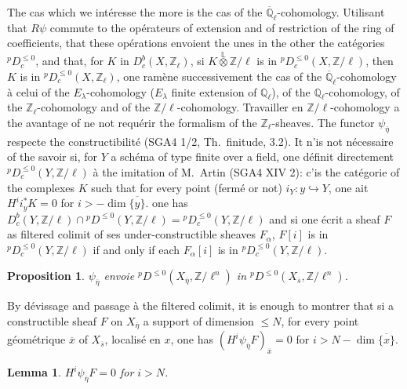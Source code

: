 \documentclass[12pt,a4paper]{article}
\theoremstyle{plain}
\newtheorem{lemma}[theorem]{Lemma}
\newtheorem{proposition}[theorem]{Proposition}
\theoremstyle{definition}
\newcommand{\into}{\hookrightarrow}
\begin{document}
{{The cas which we int\'{e}resse the more is the cas of the $\overline{\mathbb{Q}}_{\ell}$-cohomology. Utilisant that $R\psi$ commute to the op\'{e}rateurs of extension and of restriction of the ring of coefficients, that these op\'{e}rations envoient the unes in the other the cat\'{e}gories ${}^{p}D_{c}^{\leq 0}$, and that, for $K$ in $D_{c}^{b}(X,\mathbb{Z}_{\ell})$, si $K \overset{\mathbb{L}}{\otimes} \mathbb{Z}/\ell$ is in ${}^{p}D_{c}^{\leq 0}(X,\mathbb{Z}/\ell)$, then $K$ is in ${}^{p}D_{c}^{\leq 0}(X,\mathbb{Z}_{\ell})$, one ram\`{e}ne successivement the cas of the $\overline{\mathbb{Q}}_{\ell}$-cohomology \`{a} celui of the $E_{\lambda}$-cohomology ($E_{\lambda}$ finite extension of $\mathbb{Q}_{\ell}$), of the $\mathbb{Q}_{\ell}$-cohomology, of the $\mathbb{Z}_{\ell}$-cohomology and of the $\mathbb{Z}/\ell$-cohomology. Travailler en $\mathbb{Z}/\ell$-cohomology a the avantage of ne not requ\'{e}rir the formalism of the $\mathbb{Z}_{\ell}$-sheaves. The functor $\psi_{\overline{\eta}}$ respecte the constructibilit\'{e} (SGA4 1/2, Th.\ finitude, 3.2). It n'is not n\'{e}cessaire of the savoir si, for $Y$ a sch\'{e}ma of type finite over a field, one d\'{e}finit directement ${}^{p}D_{c}^{\leq 0}(Y,\mathbb{Z}/\ell)$ \`{a} the imitation of M.~Artin (SGA4 XIV 2): c'is the cat\'{e}gorie of the complexes $K$ such that for every point (ferm\'{e} or not) $i_{Y}: y \into Y$, one ait $H^{i}i_{y}^{*}K = 0$ for $i > -\dim\overline{\{y\}}$. one has $D_{c}^{b}(Y,\mathbb{Z}/\ell) \cap {}^{p}D^{\leq 0}(Y,\mathbb{Z}/\ell) = {}^{p}D_{c}^{\leq 0}(Y,\mathbb{Z}/\ell)$ and si one \'{e}crit a sheaf $F$ as filtered colimit of ses under-constructible sheaves $F_{\alpha}$, $F[i]$ is in ${}^{p}D_{c}^{\leq 0}(Y,\mathbb{Z}/\ell)$ if and only if each $F_{\alpha}[i]$ is in ${}^{p}D_{c}^{\leq 0}(Y,\mathbb{Z}/\ell)$.

\begin{proposition}\label{prop:4.4.2}
$\psi_{\overline{\eta}}$ envoie ${}^{p}D^{\leq 0}(X_{\overline{\eta}}, \mathbb{Z}/\ell^{n})$ in ${}^{p}D^{\leq 0}(X_{\overline{s}}, \mathbb{Z}/\ell^{n})$.
\end{proposition}

By d\'{e}vissage and passage \`{a} the filtered colimit, it is enough to montrer that si a constructible sheaf $F$ on $X_{\overline{\eta}}$ a support of dimension $\leq N$, for every point g\'{e}om\'{e}trique $\overline{x}$ of $X_{\overline{s}}$, localis\'{e} en $x$, one has $(H^{i}\psi_{\overline{\eta}}F)_{\overline{x}} = 0$ for $i > N - \dim\overline{\{x\}}$.

\begin{lemma}\label{lem:4.4.3}
$H^{i}\psi_{\overline{\eta}}F = 0$ for $i > N$.
\end{lemma}

}}
\end{document}
